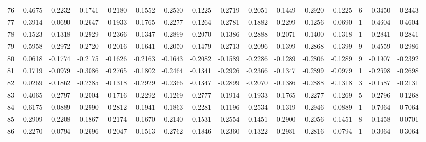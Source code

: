 \begin{tabular}{lrrrrrrrrrrrrrrr}
76  &     -0.4675 & -0.2232 & -0.1741 & -0.2180 & -0.1552 & -0.2530 & -0.1225 & -0.2719 & -0.2051 & -0.1449 &  -0.2920 &    -0.1225 &      6 &                    0.3450 &                     0.2443 \\
77  &      0.3914 & -0.0690 & -0.2647 & -0.1933 & -0.1765 & -0.2277 & -0.1264 & -0.2781 & -0.1882 & -0.2299 &  -0.1256 &    -0.0690 &      1 &                   -0.4604 &                    -0.4604 \\
78  &      0.1523 & -0.1318 & -0.2929 & -0.2366 & -0.1347 & -0.2899 & -0.2070 & -0.1386 & -0.2888 & -0.2071 &  -0.1400 &    -0.1318 &      1 &                   -0.2841 &                    -0.2841 \\
79  &     -0.5958 & -0.2972 & -0.2720 & -0.2016 & -0.1641 & -0.2050 & -0.1479 & -0.2713 & -0.2096 & -0.1399 &  -0.2868 &    -0.1399 &      9 &                    0.4559 &                     0.2986 \\
80  &      0.0618 & -0.1774 & -0.2175 & -0.1626 & -0.2163 & -0.1643 & -0.2082 & -0.1589 & -0.2286 & -0.1289 &  -0.2806 &    -0.1289 &      9 &                   -0.1907 &                    -0.2392 \\
81  &      0.1719 & -0.0979 & -0.3086 & -0.2765 & -0.1802 & -0.2464 & -0.1341 & -0.2926 & -0.2366 & -0.1347 &  -0.2899 &    -0.0979 &      1 &                   -0.2698 &                    -0.2698 \\
82  &      0.0269 & -0.1862 & -0.2285 & -0.1318 & -0.2929 & -0.2366 & -0.1347 & -0.2899 & -0.2070 & -0.1386 &  -0.2888 &    -0.1318 &      3 &                   -0.1587 &                    -0.2131 \\
83  &     -0.4065 & -0.2797 & -0.2004 & -0.1716 & -0.2292 & -0.1269 & -0.2777 & -0.1914 & -0.1933 & -0.1765 &  -0.2277 &    -0.1269 &      5 &                    0.2796 &                     0.1268 \\
84  &      0.6175 & -0.0889 & -0.2990 & -0.2812 & -0.1941 & -0.1863 & -0.2281 & -0.1196 & -0.2534 & -0.1319 &  -0.2946 &    -0.0889 &      1 &                   -0.7064 &                    -0.7064 \\
85  &     -0.2909 & -0.2208 & -0.1867 & -0.2174 & -0.1670 & -0.2140 & -0.1531 & -0.2554 & -0.1451 & -0.2900 &  -0.2056 &    -0.1451 &      8 &                    0.1458 &                     0.0701 \\
86  &      0.2270 & -0.0794 & -0.2696 & -0.2047 & -0.1513 & -0.2762 & -0.1846 & -0.2360 & -0.1322 & -0.2981 &  -0.2816 &    -0.0794 &      1 &                   -0.3064 &                    -0.3064 \\

\end{tabular}
